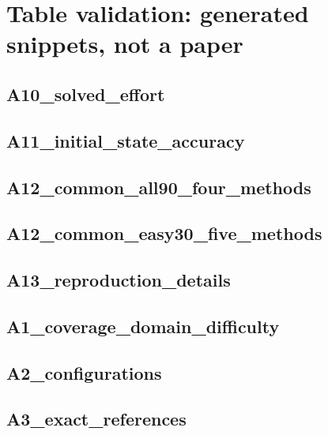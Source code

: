 \documentclass{article}
\begin{document}
\section*{Table validation: generated snippets, not a paper}
\clearpage
\subsection*{A10\_\allowbreak{}solved\_\allowbreak{}effort}

\clearpage
\subsection*{A11\_\allowbreak{}initial\_\allowbreak{}state\_\allowbreak{}accuracy}

\clearpage
\subsection*{A12\_\allowbreak{}common\_\allowbreak{}all90\_\allowbreak{}four\_\allowbreak{}methods}

\clearpage
\subsection*{A12\_\allowbreak{}common\_\allowbreak{}easy30\_\allowbreak{}five\_\allowbreak{}methods}

\clearpage
\subsection*{A13\_\allowbreak{}reproduction\_\allowbreak{}details}

\clearpage
\subsection*{A1\_\allowbreak{}coverage\_\allowbreak{}domain\_\allowbreak{}difficulty}

\clearpage
\subsection*{A2\_\allowbreak{}configurations}

\clearpage
\subsection*{A3\_\allowbreak{}exact\_\allowbreak{}references}

\clearpage
\end{document}
